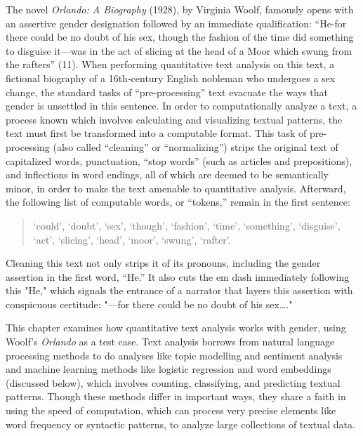 \documentclass[11pt]{article}
\begin{document}
The novel \emph{Orlando: A Biography} (1928), by Virginia Woolf, famously
opens with an assertive gender designation followed by an immediate
qualification: “He-for there could be no doubt of his sex, though the
fashion of the time did something to disguise it—was in the act of
slicing at the head of a Moor which swung from the rafters” (11). When
performing quantitative text analysis on this text, a fictional
biography of a 16th-century English nobleman who undergoes a sex
change, the standard tasks of “pre-processing” text evacuate the ways
that gender is unsettled in this sentence. In order to computationally
analyze a text, a process known which involves calculating and
visualizing textual patterns, the text must first be transformed into
a computable format. This task of pre-processing (also called
“cleaning” or “normalizing”) strips the original text of capitalized
words, punctuation, “stop words” (such as articles and prepositions),
and inflections in word endings, all of which are deemed to be
semantically minor, in order to make the text amenable to quantitative
analysis. Afterward, the following list of computable words, or
“tokens,” remain in the first sentence:
\begin{quote}
‘could’, ‘doubt’, ‘sex’, ‘though’, ‘fashion’, ‘time’, ‘something’,
‘disguise’, ‘act’, ‘slicing’, ‘head’, ‘moor’, ‘swung’, ‘rafter’.
\end{quote}
Cleaning this text not only strips it of its pronouns, including the
gender assertion in the first word, “He.” It also cuts the em dash
immediately following this "He," which signals the entrance of a
narrator that layers this assertion with conspicuous certitude: "—for
there could be no doubt of his sex…."

This chapter examines how quantitative text analysis works with
gender, using Woolf's \emph{Orlando} as a test case. Text analysis borrows
from natural language processing methods to do analyses like topic
modelling and sentiment analysis and machine learning methods like
logistic regression and word embeddings (discussed below), which
involves counting, classifying, and predicting textual
patterns. Though these methods differ in important ways, they share a
faith in using the speed of computation, which can process very
precise elements like word frequency or syntactic patterns, to analyze
large collections of textual data.
\end{document}
